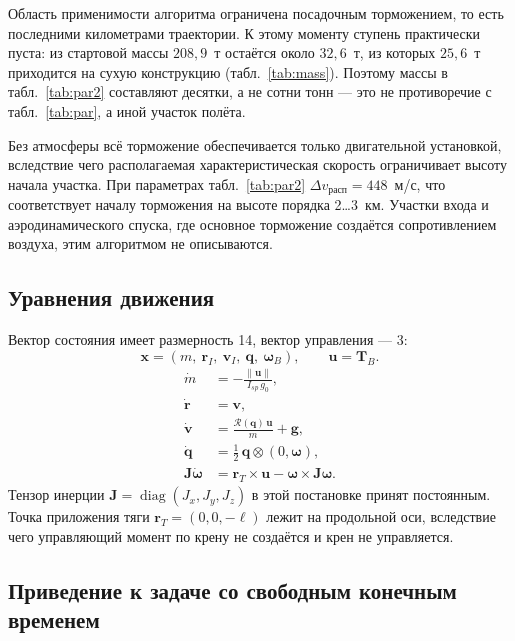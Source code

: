 \documentclass[11pt,a4paper]{article}
\newcommand{\vect}[1]{\bm{#1}}
\newcommand{\quat}[1]{\bm{#1}}
\newcommand{\Rot}{\mathcal{R}}
\begin{document}
Область применимости алгоритма ограничена посадочным торможением, то есть
последними километрами траектории. К этому моменту ступень практически пуста:
из стартовой массы $208{,}9$~т остаётся около $32{,}6$~т, из которых $25{,}6$~т
приходится на сухую конструкцию (табл.~\ref{tab:mass}). Поэтому массы в
табл.~\ref{tab:par2} составляют десятки, а не сотни тонн — это не противоречие с
табл.~\ref{tab:par}, а иной участок полёта.

Без атмосферы всё торможение обеспечивается только двигательной установкой,
вследствие чего располагаемая характеристическая скорость ограничивает высоту
начала участка. При параметрах табл.~\ref{tab:par2}
$\Delta v_{\text{расп}}=448$~м/с, что соответствует началу торможения на высоте
порядка 2\dots3~км. Участки входа и аэродинамического спуска, где основное
торможение создаётся сопротивлением воздуха, этим алгоритмом не описываются.

\subsection{Уравнения движения}

Вектор состояния имеет размерность 14, вектор управления — 3:
\begin{equation}
\vect{x}=\left(m,\ \vect{r}_I,\ \vect{v}_I,\ \quat{q},\
 \boldsymbol{\omega}_B\right),
\qquad
\vect{u}=\vect{T}_B .
\end{equation}
\begin{align}
\dot m &= -\frac{\lVert\vect{u}\rVert}{I_{sp}\,g_0}, \label{eq:pdgm}\\
\dot{\vect{r}} &= \vect{v}, \\
\dot{\vect{v}} &= \frac{\Rot(\quat{q})\,\vect{u}}{m} + \vect{g}, \\
\dot{\quat{q}} &= \tfrac{1}{2}\,\quat{q}\otimes(0,\boldsymbol{\omega}), \\
\vect{J}\dot{\boldsymbol{\omega}} &= \vect{r}_T\times\vect{u}
  - \boldsymbol{\omega}\times\vect{J}\boldsymbol{\omega}. \label{eq:pdgw}
\end{align}
Тензор инерции $\vect{J}=\operatorname{diag}(J_x,J_y,J_z)$ в этой постановке
принят постоянным. Точка приложения тяги $\vect{r}_T=(0,0,-\ell)$ лежит на
продольной оси, вследствие чего управляющий момент по крену не создаётся и крен
не управляется.

\subsection{Приведение к задаче со свободным конечным временем}
\end{document}
